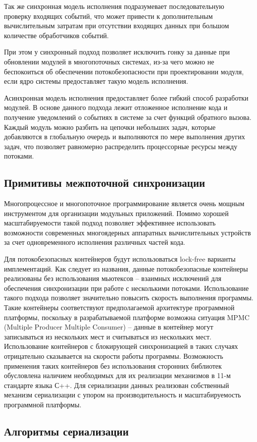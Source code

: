 Так же синхронная модель исполнения подразумевает последовательную проверку входящих событий, что может привести к дополнительным вычислительным затратам при отсутствии входящих данных при большом количестве обработчиков событий.

При этом у синхронный подход позволяет исключить гонку за данные при обновлении модулей в многопоточных системах, из-за чего можно не беспокоиться об обеспечении потокобезопасности при проектировании модуля, если ядро системы предоставляет такую модель исполнения.

Асинхронная модель исполнения предоставляет более гибкий способ разработки модулей. В основе данного подхода лежит отложенное исполнение кода и получение уведомлений о событиях в системе за счет функций обратного вызова. Каждый модуль можно разбить на цепочки небольших задач, которые добавляются в глобальную очередь и выполняются по мере выполнения других задач, что позволяет равномерно распределить процессорные ресурсы между потоками.

\subsection{Примитивы межпоточной синхронизации}

Многопроцессное и многопоточное программирование является очень мощным инструментом для организации модульных приложений. Помимо хорошей масштабируемости такой подход позволяет эффективнее использовать возможности современных многоядерных аппаратных вычислительных устройств за счет одновременного исполнения различных частей кода.

Для потокобезопасных контейнеров будут использоваться lock-free варианты имплементаций. Как следует из названия, данные потокобезопасные контейнеры реализованы без использования мьютексов – взаимных исключений для обеспечения синхронизации при работе с несколькими потоками. Использование такого подхода позволяет значительно повысить скорость выполнения программы. Такие контейнеры соответствуют предполагаемой архитектуре программной платформы, поскольку в разрабатываемой платформе возможна ситуация MPMC (Multiple Producer Multiple Consumer) – данные в контейнер могут записываться из нескольких мест и считываться из нескольких мест. Использование контейнеров с блокирующей синхронизацией в таких случаях отрицательно сказывается на скорости работы программы. Возможность применения таких контейнеров без использования сторонних библиотек обусловлена наличием необходимых для их реализации механизмов в 11-м стандарте языка С++. Для сериализации данных реализован собственный механизм сериализации с упором на производительность и масштабируемость программной платформы.

\subsection{Алгоритмы сериализации}

